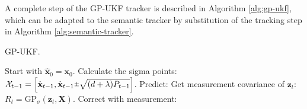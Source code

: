 A complete step of the GP-UKF tracker is described in Algorithm \ref{alg:gp-ukf}, which can be adapted to the semantic tracker by substitution of the tracking step in Algorithm \ref{alg:semantic-tracker}.
\begin{algorithm}
\caption{GP-UKF.}\label{alg:gp-ukf}
\begin{algorithmic}[1]
\State Start with $\hat{\mathbf{x}}_{0} = \mathbf{x}_{0}$.
\State Calculate the sigma points: $\mathcal{X}_{t-1} = \left[\hat{\mathbf{x}}_{t-1}, \hat{\mathbf{x}}_{t-1}\rpm\sqrt{(d+\lambda)P_{t-1}}\right]$.
\State Predict:
\State Get measurement covariance of $\mathbf{z}_{t}$: $ R_t = \text{GP}_{\sigma}(\mathbf{z}_t, \mathbf{X})$.
\State Correct with measurement:
\end{algorithmic}
\end{algorithm}

